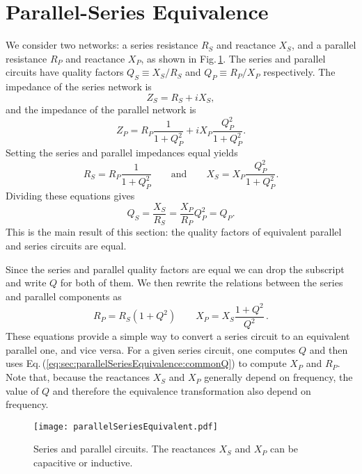 \section{Parallel-Series Equivalence}

We consider two networks: a series resistance $R_{S}$ and reactance $X_{S}$, and a parallel resistance $R_P$ and reactance $X_P$, as shown in Fig.\,\ref{Fig:parallelSeriesEquivalent}.
The series and parallel circuits have quality factors $Q_S \equiv X_S / R_S$ and $Q_P \equiv R_P / X_P$ respectively.
The impedance of the series network is \begin{equation}
Z_{S}=R_{S}+iX_{S} , \end{equation}
and the impedance of the parallel network is \begin{equation}
Z_{P}=R_{P}\frac{1}{1+Q_{P}^{2}}+iX_{P}\frac{Q_{P}^{2}}{1+Q_{P}^{2}} . \end{equation}
Setting the series and parallel impedances equal yields \begin{equation}
R_{S}=R_{P}\frac{1}{1+Q_{P}^{2}} \qquad \text{and} \qquad X_{S}=X_{P}\frac{Q_{P}^{2}}{1+Q_{P}^{2}} . \end{equation}
Dividing these equations gives\begin{equation}
Q_S = \frac{X_{S}}{R_{S}}=\frac{X_{P}}{R_{P}}Q_{P}^{2}=Q_{P} . \end{equation}
This is the main result of this section: the quality factors of equivalent parallel and series circuits are equal.

Since the series and parallel quality factors are equal we can drop the subscript and write $Q$ for both of them.
We then rewrite the relations between the series and parallel components as \begin{equation}
R_{P}=R_{S}(1 + Q^2) \qquad X_{P} = X_{S}\frac{1 + Q^{2}}{Q^{2}} \, . \label{eq:sec:parallelSeriesEquivalence:commonQ} \end{equation}
These equations provide a simple way to convert a series circuit to an equivalent parallel one, and vice versa.
For a given series circuit, one computes $Q$ and then uses Eq.\,(\ref{eq:sec:parallelSeriesEquivalence:commonQ}) to compute $X_P$ and $R_P$.
Note that, because the reactances $X_S$ and $X_P$ generally depend on frequency, the value of $Q$ and therefore the equivalence transformation also depend on frequency.


\begin{figure}
\begin{centering}
\texttt{[image: parallelSeriesEquivalent.pdf]} 
\par\end{centering}
\caption{Series and parallel circuits. The reactances $X_S$ and $X_P$ can be capacitive or inductive.}
\label{Fig:parallelSeriesEquivalent}
\end{figure}


